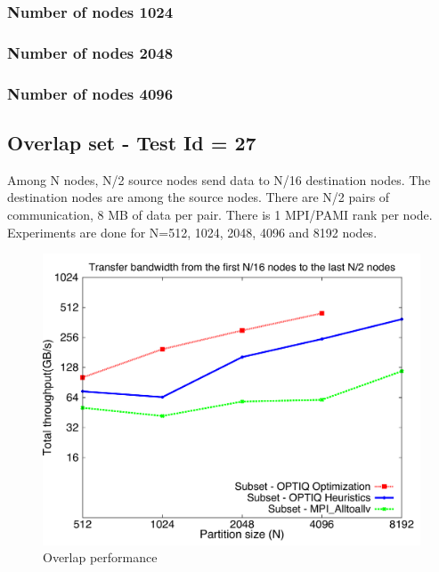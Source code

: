 \documentclass[letter]{article}
\begin{document}




\newpage

\subsubsection{Number of nodes 1024}





\newpage

\subsubsection{Number of nodes 2048}



\newpage

\subsubsection{Number of nodes 4096}



\newpage

\subsection{Overlap set - Test Id = 27}

Among N nodes, N/2 source nodes send data to N/16 destination nodes. The destination nodes are among the source nodes. There are N/2 pairs of communication, 8 MB of data per pair. There is 1 MPI/PAMI rank per node. Experiments are done for N=512, 1024, 2048, 4096 and 8192 nodes.

\begin{figure}[h]
\vspace{-0.1in}
\centering
\includegraphics[scale=0.40]{report_figures/constantr_27.pdf}
\vspace{-0.1in}
\caption{Overlap performance}
\vspace{-0.1in}
\label{fig:patterns}
\end{figure}
\end{document}
